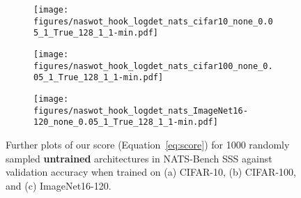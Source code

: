 \documentclass{article}
\begin{document}
\begin{figure}[!h]

    \centering
    \begin{subfigure}[b]{0.3\textwidth}
        \texttt{[image: figures/naswot\_hook\_logdet\_nats\_cifar10\_none\_0.05\_1\_True\_128\_1\_1-min.pdf]}
        \caption{}
    \end{subfigure}
    \hfill
    \begin{subfigure}[b]{0.3\textwidth}
         \centering
         \texttt{[image: figures/naswot\_hook\_logdet\_nats\_cifar100\_none\_0.05\_1\_True\_128\_1\_1-min.pdf]}
         \caption{}
     \end{subfigure}
     \hfill
     \begin{subfigure}[b]{0.3\textwidth}
         \centering
         \texttt{[image: figures/naswot\_hook\_logdet\_nats\_ImageNet16-120\_none\_0.05\_1\_True\_128\_1\_1-min.pdf]}
         \caption{}
     \end{subfigure}
    
    \caption{Further plots of our score (Equation~\ref{eq:score}) for 1000 randomly sampled {\bf untrained} architectures in 
   NATS-Bench SSS
   against validation accuracy when trained on (a) CIFAR-10, (b) CIFAR-100, and (c) ImageNet16-120.}
    \label{fig:extraplots-NATS} 
\end{figure}

\vspace{-5cm}
\end{document}
